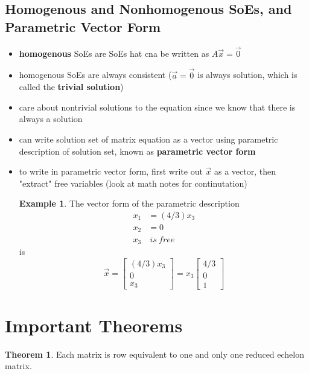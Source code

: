 \documentclass[a4paper,12pt]{article}
\theoremstyle{definition}
\newtheorem{theorem}{Theorem}
\theoremstyle{definition}
\newtheorem{example}{Example}[subsection]
\begin{document}
	\subsection{Homogenous and Nonhomogenous SoEs, and Parametric Vector Form}
	\begin{itemize}
		\item \textbf{homogenous} SoEs are SoEs hat cna be written as $A\vec{x} = \vec{0}$
		
		\item homogenous SoEs are always consistent ($\vec{a} = \vec{0}$ is always solution, which is called the \textbf{trivial solution})
		
		\item care about nontrivial solutions to the equation since we know that there is always a solution
		
		\item can write solution set of matrix equation as a vector using parametric description of solution set, known as \textbf{parametric vector form}
		
		\item to write in parametric vector form, first write out $\vec{x}$ as a vector, then "extract" free variables (look at math notes for continutation)
		
		\begin{example}
			The vector form of the parametric description
			\begin{align*}
				x_1 &= (4/3)x_3\\
				x_2 &= 0\\
				x_3 &\:is \:free
			\end{align*}
			is
			\begin{equation*}
				\vec{x} =
				\begin{bmatrix}
					(4/3)x_3\\
					0\\
					x_3
				\end{bmatrix}
				= x_3
				\begin{bmatrix}
					4/3\\
					0\\
					1
				\end{bmatrix}
			\end{equation*}
		\end{example}
	\end{itemize}
	\newpage
	
	\section{Important Theorems}
	\begin{theorem}
		Each matrix is row equivalent to one and only one reduced echelon matrix.
	\end{theorem}
	
\end{document}
